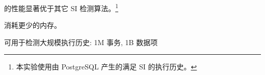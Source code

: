 % 		


\begin{frame}{}
	\centerline{\polysi{} 的性能显著优于其它 SI 检测算法。\footnote{
		本实验使用由 PostgreSQL 产生的满足 SI 的执行历史。
	}}

\end{frame}

\begin{frame}{}
	\centerline{\polysi{} 消耗更少的内存。}
\end{frame}

\begin{frame}{}
	\begin{center}
		\polysi{} 可用于检测大规模执行历史: 1M 事务, 1B 数据项

		\vspace{0.30cm}
		\vspace{0.30cm}
	\end{center}
\end{frame}

